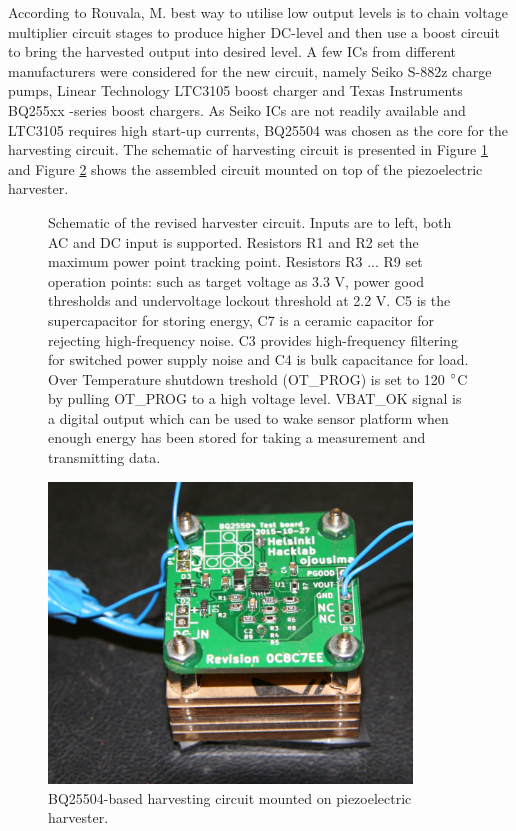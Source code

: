 According to Rouvala, M. \cite{Rouvala2015} best way to utilise low output levels is to chain voltage multiplier circuit stages to produce higher DC-level and then use a boost circuit to bring the harvested output into desired level. A few ICs from different manufacturers were considered for the new circuit, namely Seiko S-882z \cite{SeikoInstruments2010} charge pumps, Linear Technology LTC3105 \cite{ltc3015} boost charger and Texas Instruments BQ255xx -series boost chargers. As Seiko ICs are not readily available and LTC3105 requires high start-up currents, BQ25504 \cite{bq25504} was chosen as the core for the harvesting circuit. The schematic of harvesting circuit is presented in Figure \ref{fig:bq25504} and Figure \ref{fig:bq25504_mounted} shows the assembled circuit mounted on top of the piezoelectric harvester.


\begin{figure}
    \centering
    \def\svgwidth{\columnwidth}
    
    \caption{\label{fig:bq25504} Schematic of the revised harvester circuit. Inputs are to left, both AC and DC input is supported. Resistors R1 and R2 set the maximum power point tracking point. Resistors R3 ... R9 set operation points: such as target voltage as 3.3 V, power good thresholds and undervoltage lockout threshold at 2.2 V. C5 is the supercapacitor for storing energy, C7 is a ceramic capacitor for rejecting high-frequency noise. C3 provides high-frequency filtering for switched power supply noise and C4 is bulk capacitance for load. Over Temperature shutdown treshold (OT\_PROG) is set to 120 $\degree$C by pulling OT\_PROG to a high voltage level. VBAT\_OK signal is a digital output which can be used to wake sensor platform when enough energy has been stored for taking a measurement and transmitting data.}
\end{figure}

\begin{figure}[htb]
\begin{center}
\includegraphics[height=8cm]{images/own_pic/tyre_fixture/piezo_bq_desk.jpg}
\end{center}
\caption{\label{fig:bq25504_mounted} BQ25504-based harvesting circuit mounted on piezoelectric harvester.}
\end{figure}

